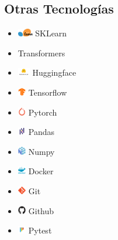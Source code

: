 \documentclass{article}
\begin{document}
\begin{multicols}{3}
\section*{Otras Tecnologías}
\begin{itemize}
    \item \includegraphics[height=10pt]{images/icons/sklearn.png} SKLearn
    \item Transformers
    \item \includegraphics[height=10pt]{images/icons/huggingface.png} Huggingface
    \item \includegraphics[height=10pt]{images/icons/tensorflow-original.png} Tensorflow
    \item \includegraphics[height=10pt]{images/icons/pytorch-original.png} Pytorch
    \item \includegraphics[height=10pt]{images/icons/pandas-original.png} Pandas
    \item \includegraphics[height=10pt]{images/icons/numpy-original.png} Numpy
    \item \includegraphics[height=10pt]{images/icons/docker.png} Docker
    \item \includegraphics[height=10pt]{images/icons/git-original.png} Git
    \item \includegraphics[height=10pt]{images/icons/github-original.png} Github
    \item \includegraphics[height=10pt]{images/icons/pytest-original.png} Pytest 

\end{itemize}
\end{multicols}
\end{document}
